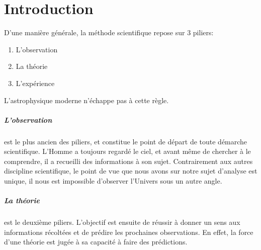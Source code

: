 \chapter{Introduction}

D'une manière générale, la méthode scientifique repose sur 3 piliers: 
\begin{enumerate}
\item L'observation
\item La théorie
\item L'expérience
\end{enumerate}
L'astrophysique moderne n’échappe pas à cette règle.

\paragraph{L'observation} est le plus ancien des piliers, et constitue le point de départ de toute démarche scientifique.
L'Homme a toujours regardé le ciel, et avant même de chercher à le comprendre, il a recueilli des informations à son sujet. %
Contrairement aux autres discipline scientifique, le point de vue que nous avons sur notre sujet d'analyse est unique, il nous est impossible d'observer l'Univers sous un autre angle.


\paragraph{La théorie} est le deuxième piliers.
L'objectif est ensuite de réussir à donner un sens aux informations récoltées et de prédire les prochaines observations.
En effet, la force d'une théorie est jugée à sa capacité à faire des prédictions.

